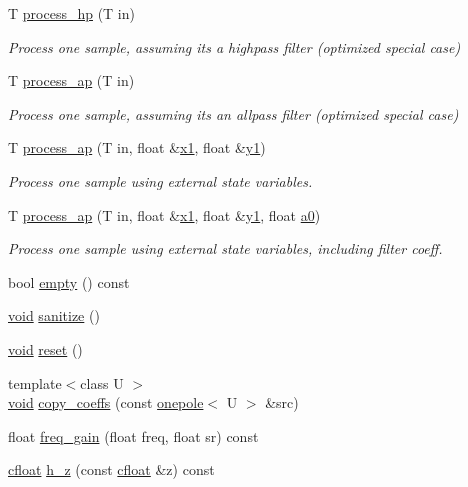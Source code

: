 \begin{DoxyCompactItemize}
T \hyperlink{classdsp_1_1onepole_ab7bb0b90b38f0f9777f5d38dc2f9de17}{process\+\_\+hp} (T in)
\begin{DoxyCompactList}\small\item\em Process one sample, assuming it\textquotesingle{}s a highpass filter (optimized special case) \end{DoxyCompactList}\item 
T \hyperlink{classdsp_1_1onepole_ae028f57818ff34c1c2320582fe94e97a}{process\+\_\+ap} (T in)
\begin{DoxyCompactList}\small\item\em Process one sample, assuming it\textquotesingle{}s an allpass filter (optimized special case) \end{DoxyCompactList}\item 
T \hyperlink{classdsp_1_1onepole_a43039093c73288de193d91d84d9cceea}{process\+\_\+ap} (T in, float \&\hyperlink{classdsp_1_1onepole_a43750f73796581da8310aa56fc0914a8}{x1}, float \&\hyperlink{classdsp_1_1onepole_a4de5f5e37475dfa0b6a3f44827bb1272}{y1})
\begin{DoxyCompactList}\small\item\em Process one sample using external state variables. \end{DoxyCompactList}\item 
T \hyperlink{classdsp_1_1onepole_a642a17ac8c926e6137be1c5144fb63cb}{process\+\_\+ap} (T in, float \&\hyperlink{classdsp_1_1onepole_a43750f73796581da8310aa56fc0914a8}{x1}, float \&\hyperlink{classdsp_1_1onepole_a4de5f5e37475dfa0b6a3f44827bb1272}{y1}, float \hyperlink{classdsp_1_1onepole_add0620a77694639de6532365beb0c73c}{a0})
\begin{DoxyCompactList}\small\item\em Process one sample using external state variables, including filter coeff. \end{DoxyCompactList}\item 
bool \hyperlink{classdsp_1_1onepole_a772fdfa1e9f2ac2bb12d77d117c15c9a}{empty} () const 
\item 
\hyperlink{tk_8h_aba408b7cd755a96426e004c015f5de8e}{void} \hyperlink{classdsp_1_1onepole_adfb66de53e160495d200d8a8cb060967}{sanitize} ()
\item 
\hyperlink{tk_8h_aba408b7cd755a96426e004c015f5de8e}{void} \hyperlink{classdsp_1_1onepole_a7173d7a7b486b1f071e75941d60f13bf}{reset} ()
\item 
{\footnotesize template$<$class U $>$ }\\\hyperlink{tk_8h_aba408b7cd755a96426e004c015f5de8e}{void} \hyperlink{classdsp_1_1onepole_ab82fdedc9505047889e6ef8b5ca110eb}{copy\+\_\+coeffs} (const \hyperlink{classdsp_1_1onepole}{onepole}$<$ U $>$ \&src)
\item 
float \hyperlink{classdsp_1_1onepole_a4c52265c295ef35b0f9155a4c2252f45}{freq\+\_\+gain} (float freq, float sr) const 
\item 
\hyperlink{classdsp_1_1onepole_aa3ec578cfbf7c9821819c7fb6fef5bfb}{cfloat} \hyperlink{classdsp_1_1onepole_ad3f5849e3f86bb84a6707e3198cbd8b7}{h\+\_\+z} (const \hyperlink{classdsp_1_1onepole_aa3ec578cfbf7c9821819c7fb6fef5bfb}{cfloat} \&z) const 
\end{DoxyCompactItemize}
